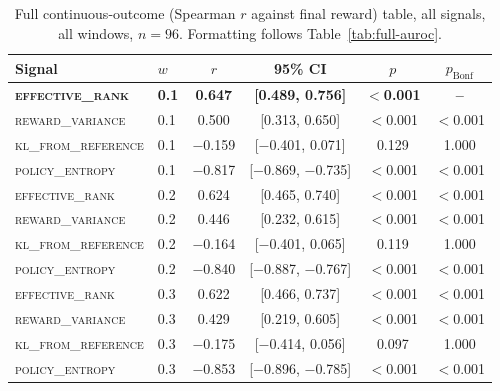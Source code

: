 \documentclass{article}
\newcommand{\erank}{\textsc{effective\_rank}}
\newcommand{\pentropy}{\textsc{policy\_entropy}}
\newcommand{\klref}{\textsc{kl\_from\_reference}}
\newcommand{\rvar}{\textsc{reward\_variance}}
\begin{document}
\begin{table}[h]
\centering
\caption{Full continuous-outcome (Spearman $r$ against final reward) table,
all signals, all windows, $n{=}96$. Formatting follows
Table~\ref{tab:full-auroc}.}
\label{tab:full-spearman}
\begin{tabular}{llcccc}
\toprule
Signal & $w$ & $r$ & 95\% CI & $p$ & $p_{\text{Bonf}}$ \\
\midrule
\textbf{\erank} & \textbf{0.1} & \textbf{0.647} & \textbf{[0.489, 0.756]} & \textbf{$<$0.001} & \textbf{--} \\
\rvar & 0.1 & 0.500 & [0.313, 0.650] & $<$0.001 & $<$0.001 \\
\klref & 0.1 & $-$0.159 & [$-$0.401, 0.071] & 0.129 & 1.000 \\
\pentropy & 0.1 & $-$0.817 & [$-$0.869, $-$0.735] & $<$0.001 & $<$0.001 \\
\midrule
\erank & 0.2 & 0.624 & [0.465, 0.740] & $<$0.001 & $<$0.001 \\
\rvar & 0.2 & 0.446 & [0.232, 0.615] & $<$0.001 & $<$0.001 \\
\klref & 0.2 & $-$0.164 & [$-$0.401, 0.065] & 0.119 & 1.000 \\
\pentropy & 0.2 & $-$0.840 & [$-$0.887, $-$0.767] & $<$0.001 & $<$0.001 \\
\midrule
\erank & 0.3 & 0.622 & [0.466, 0.737] & $<$0.001 & $<$0.001 \\
\rvar & 0.3 & 0.429 & [0.219, 0.605] & $<$0.001 & $<$0.001 \\
\klref & 0.3 & $-$0.175 & [$-$0.414, 0.056] & 0.097 & 1.000 \\
\pentropy & 0.3 & $-$0.853 & [$-$0.896, $-$0.785] & $<$0.001 & $<$0.001 \\
\bottomrule
\end{tabular}
\end{table}
\end{document}
